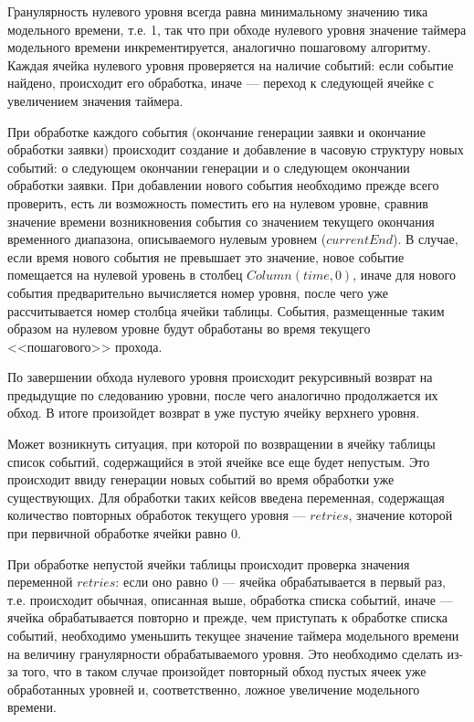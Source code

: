Гранулярность нулевого уровня всегда равна минимальному значению тика модельного времени, т.е. 1, так что при обходе нулевого уровня значение таймера модельного времени инкрементируется, аналогично пошаговому алгоритму. Каждая ячейка нулевого уровня проверяется на наличие событий:
если событие найдено, происходит его обработка, иначе --- переход к следующей ячейке с увеличением значения таймера.

При обработке каждого события (окончание генерации заявки и окончание обработки заявки) происходит создание и добавление в часовую структуру новых событий: о следующем окончании генерации и о следующем окончании обработки заявки. При добавлении нового события необходимо прежде всего проверить, есть ли возможность поместить его на нулевом уровне, сравнив значение времени возникновения события со значением текущего окончания временного диапазона, описываемого нулевым уровнем ($currentEnd$). В случае, если время нового события не превышает это значение, новое событие помещается на нулевой уровень в столбец $Column(time, 0)$, иначе для нового события предварительно вычисляется номер уровня, после чего уже рассчитывается номер столбца ячейки таблицы. События, размещенные таким образом на нулевом уровне будут обработаны во время текущего <<пошагового>> прохода.

По завершении обхода нулевого уровня происходит рекурсивный возврат на предыдущие по следованию уровни, после чего аналогично продолжается их обход. В итоге произойдет возврат в уже пустую ячейку верхнего уровня.

Может возникнуть ситуация, при которой по возвращении в ячейку таблицы список событий, содержащийся в этой ячейке все еще будет непустым. Это происходит ввиду генерации новых событий во время обработки уже существующих. Для обработки таких кейсов введена переменная, содержащая количество повторных обработок текущего уровня --- $retries$, значение которой при первичной обработке ячейки равно 0. 

При обработке непустой ячейки таблицы происходит проверка значения переменной $retries$: если оно равно 0 --- ячейка обрабатывается в первый раз, т.е. происходит обычная, описанная выше, обработка списка событий, иначе --- ячейка обрабатывается повторно и прежде, чем приступать к обработке списка событий, необходимо уменьшить текущее значение таймера модельного времени на величину гранулярности обрабатываемого уровня. Это необходимо сделать из-за того, что в таком случае произойдет повторный обход пустых ячеек уже обработанных уровней и, соответственно, ложное увеличение модельного времени.

